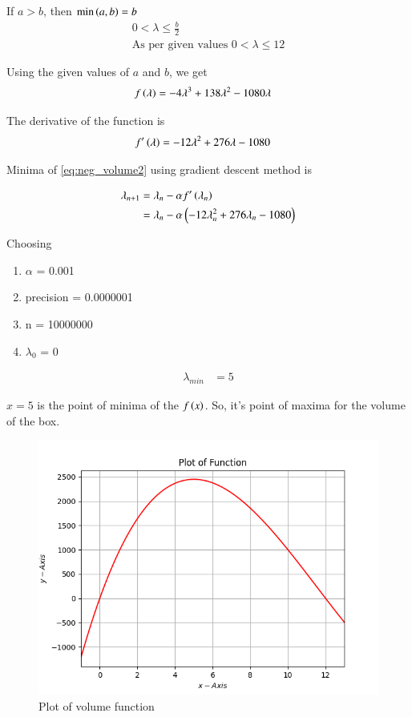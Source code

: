 \documentclass[journal,12pt,twocolumn]{IEEEtran}
\begin{document}
If $a > b$, then $\min\left(a,b\right) = b$ 
\begin{align}
    0 < \lambda \leq \frac{b}{2}\\
    \text{As per given values } 0 < \lambda \leq 12
\end{align}

Using the given values of $a$ and $b$, we get
\begin{align}
    \label{eq:neg_volume2}
    f\left(\lambda\right) &= -4\lambda^3 + 138\lambda^2 - 1080\lambda
\end{align}

The derivative of the function is
\begin{align}
    f^\prime\left(\lambda\right) &= -12\lambda^2 + 276\lambda - 1080 
\end{align}

Minima of \eqref{eq:neg_volume2} using gradient descent method is

\begin{align}
	\lambda_{n+1} &= \lambda_n - \alpha f^\prime\left(\lambda_n\right)\\
    \label{eq:grad_dec/eq1}
    &= \lambda_n - \alpha \left(-12\lambda_n^2 + 276\lambda_n - 1080\right)\\
\end{align}

Choosing
\begin{enumerate}
 \item $\alpha$ = 0.001
 \item precision = 0.0000001
 \item n = 10000000 
 \item $\lambda_0$ = 0
\end{enumerate}

\begin{align}
    \lambda_{min} &= 5
\end{align}

$x=5$ is the point of minima of the $f\left(x\right)$.
So, it's point of maxima for the volume of the box.

\begin{figure}[!htb]
    \centering
    \includegraphics[width=\columnwidth]{figs/plot.png}
    \caption{Plot of volume function}
    \label{fig:plot of function}
\end{figure}
\end{document}
